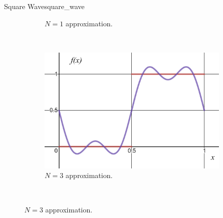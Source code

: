 \begin{ex}{Square Wave}{square_wave}
\begin{figure}[H]
\begin{subfigure}[h]{0.3\textwidth}
				\caption{$N=1$ approximation.}
			\end{subfigure}
			~
			\begin{subfigure}[h]{0.3\textwidth}
				\includegraphics[width=\textwidth]{Figures_Part_5/N=3.png}
				\caption{$N=3$ approximation.}
			\end{subfigure}\\
			

\end{figure}
\end{ex}
